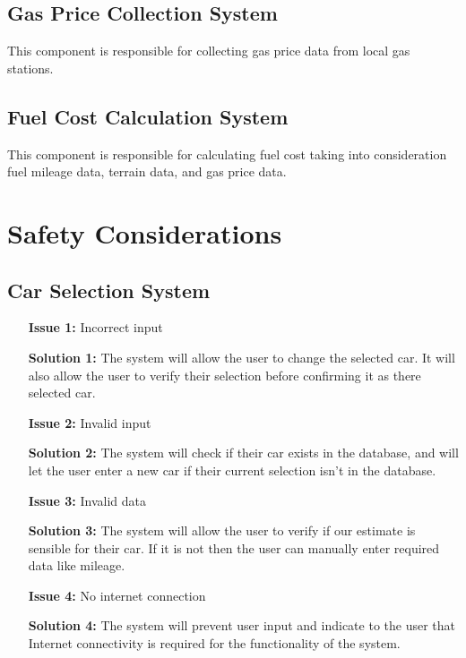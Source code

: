 \documentclass{article}
\begin{document}
\subsection{Gas Price Collection System}
This component is responsible for collecting gas price data from local gas stations.

\subsection{Fuel Cost Calculation System}
This component is responsible for calculating fuel cost taking into consideration fuel mileage data, terrain data, and gas price data.

\section{Safety Considerations}

\subsection{Car Selection System}
\begin{itemize}
	\item[\textbf{Issue 1:}] Incorrect input
	\item[\textbf{Solution 1:}] The system will allow the user to change the selected car. It will also allow the user to verify their selection 
	before confirming it as there selected car.
	\item[\textbf{Issue 2:}] Invalid input
	\item[\textbf{Solution 2:}] The system will check if their car exists in the database, and will let the user enter a new car if their current selection
	isn't in the database.
	\item[\textbf{Issue 3:}] Invalid data
	\item[\textbf{Solution 3:}] The system will allow the user to verify if our estimate is sensible for their car. If it is not then the user can 
	manually enter required data like mileage. 
	\item[\textbf{Issue 4:}] No internet connection
	\item[\textbf{Solution 4:}] The system will prevent user input and indicate to the user that Internet connectivity is required for the functionality of the system.
\end{itemize}
\end{document}
